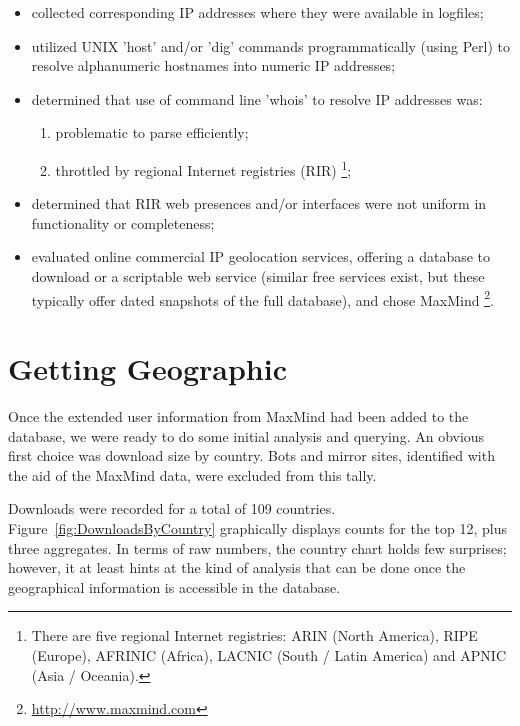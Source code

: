 \documentclass[11pt,twoside]{article}
\begin{document}
\begin{itemize}

\item collected corresponding IP addresses where they were available in logfiles;

\item utilized UNIX 'host' and/or 'dig' commands programmatically (using Perl) to resolve alphanumeric
hostnames into numeric IP addresses;

\item determined that use of command line 'whois' to resolve IP addresses was:

\begin{enumerate}

\item problematic to parse efficiently;

\item throttled by regional Internet registries (RIR) \footnote{There are 
five regional Internet registries: ARIN (North America), RIPE (Europe), 
AFRINIC (Africa), LACNIC (South / Latin America) and APNIC (Asia / 
Oceania).};

\end{enumerate}

\item determined that RIR web presences and/or interfaces were not uniform in functionality or
completeness;

\item evaluated online commercial IP geo\-location services, offering a database 
to download or a scriptable web service (similar free services exist, but these 
typically offer dated snapshots of the full database), and chose 
MaxMind \footnote{\url{http://www.maxmind.com}}.

\end{itemize}

\section{Getting Geographic}

Once the extended user information from MaxMind had been added to the database, we
were ready to do some initial analysis and querying. An obvious first choice was download
size by country. Bots and mirror sites, identified with the aid of the MaxMind data, were
excluded from this tally.

Downloads were recorded for a total of 109 countries. Figure~\ref{fig:DownloadsByCountry} graphically displays counts
for the top 12, plus three aggregates. In terms of raw numbers, the country chart holds 
few surprises; however, it at least hints at the kind of analysis that can be done once 
the geographical information is accessible in the database.
\end{document}
